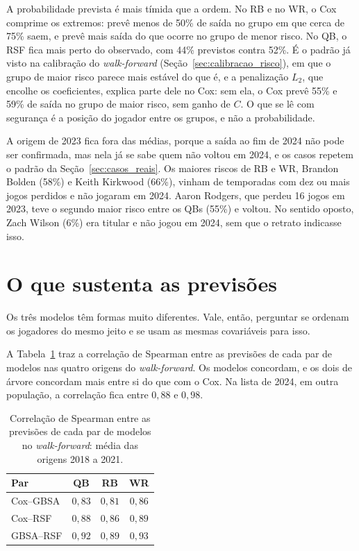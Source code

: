 A probabilidade prevista é mais tímida que a ordem. No RB e no WR, o Cox comprime os extremos: prevê menos de 50\% de saída no grupo em que cerca de 75\% saem, e prevê mais saída do que ocorre no grupo de menor risco. No QB, o RSF fica mais perto do observado, com 44\% previstos contra 52\%. É o padrão já visto na calibração do \textit{walk-forward} (Seção~\ref{sec:calibracao_risco}), em que o grupo de maior risco parece mais estável do que é, e a penalização $L_2$, que encolhe os coeficientes, explica parte dele no Cox: sem ela, o Cox prevê 55\% e 59\% de saída no grupo de maior risco, sem ganho de $C$. O que se lê com segurança é a posição do jogador entre os grupos, e não a probabilidade.

A origem de 2023 fica fora das médias, porque a saída ao fim de 2024 não pode ser confirmada, mas nela já se sabe quem não voltou em 2024, e os casos repetem o padrão da Seção~\ref{sec:casos_reais}. Os maiores riscos de RB e WR, Brandon Bolden (58\%) e Keith Kirkwood (66\%), vinham de temporadas com dez ou mais jogos perdidos e não jogaram em 2024. Aaron Rodgers, que perdeu 16 jogos em 2023, teve o segundo maior risco entre os QBs (55\%) e voltou. No sentido oposto, Zach Wilson (6\%) era titular e não jogou em 2024, sem que o retrato indicasse isso.

\section{O que sustenta as previsões}
\label{sec:concordancia}

Os três modelos têm formas muito diferentes. Vale, então, perguntar se ordenam os jogadores do mesmo jeito e se usam as mesmas covariáveis para isso.

A Tabela~\ref{tab:tgb_conc} traz a correlação de Spearman entre as previsões de cada par de modelos nas quatro origens do \textit{walk-forward}. Os modelos concordam, e os dois de árvore concordam mais entre si do que com o Cox. Na lista de 2024, em outra população, a correlação fica entre $0{,}88$ e $0{,}98$.

\begin{table}[H]
\centering
\caption{Correlação de Spearman entre as previsões de cada par de modelos no \textit{walk-forward}: média das origens 2018 a 2021.}
\label{tab:tgb_conc}
\thesistablesetup
\begin{tabular*}{\textwidth}{@{\extracolsep{\fill}}lccc@{}}
\toprule
\textbf{Par} & \textbf{QB} & \textbf{RB} & \textbf{WR} \\
\midrule
Cox--GBSA & $0{,}83$ & $0{,}81$ & $0{,}86$ \\
Cox--RSF  & $0{,}88$ & $0{,}86$ & $0{,}89$ \\
GBSA--RSF & $0{,}92$ & $0{,}89$ & $0{,}93$ \\
\bottomrule
\end{tabular*}
\end{table}

